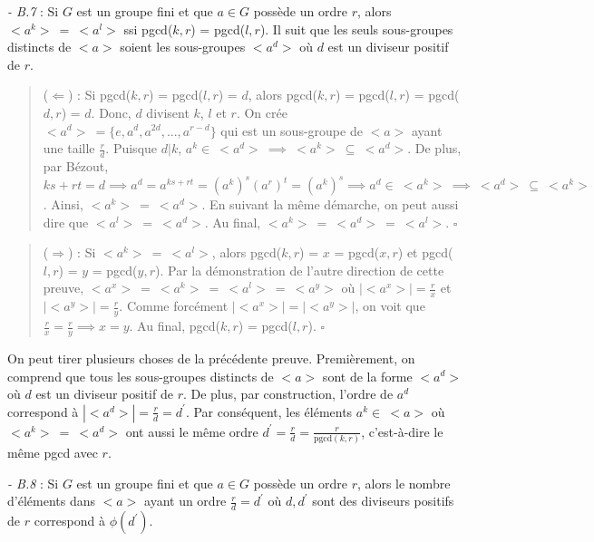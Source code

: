 \textit{- B.7} : Si $G$ est un groupe fini et que $a \in G$ possède un ordre $r$, alors $<a^k> \ =  \ <a^l>$ ssi pgcd($k,r$) = pgcd($l,r$). Il suit que les seuls sous-groupes distincts de $<a>$ soient les sous-groupes $<a^d>$ où $d$ est un diviseur positif de $r$. 

\begin{quote}
    ($\Longleftarrow$) : Si pgcd($k,r$) = pgcd($l,r$) = $d$, alors pgcd($k,r$) = pgcd($l,r$) = pgcd($d,r$) = $d$. Donc, $d$ divisent $k$, $l$ et $r$. On crée $<a^d> \ = \{e, a^d, a^{2d}, ..., a^{r-d}\}$ qui est un sous-groupe de $<a>$ ayant une taille $\frac{r}{d}$. Puisque $d|k$,  $a^k \in \ <a^d> \ \implies \ <a^k> \ \subseteq \ <a^d>$. De plus, par Bézout, $ks + rt = d \implies a^d = a^{ks+rt} = (a^k)^s(a^r)^t = (a^k)^s \implies a^d \in \ <a^k> \ \implies \ <a^d> \ \subseteq \ <a^k>$. Ainsi, $<a^k> \ = \ <a^d>$. En suivant la même démarche, on peut aussi dire que $<a^l> \ = \ <a^d>$. Au final, $<a^k> \ = \ <a^d> \ = \ <a^l>$. $\square$
\end{quote}

\begin{quote}
    ($\Longrightarrow$) : Si $<a^k> \ = \ <a^l>$, alors pgcd($k,r$) = $x$ = pgcd($x,r$) et pgcd($l,r$) = $y$ = pgcd($y,r$). Par la démonstration de l'autre direction de cette preuve, $<a^x> \ = \ <a^k> \ = \ <a^l> \ = \ <a^y>$ où $|<a^x>| = \frac{r}{x}$ et $|<a^y>| = \frac{r}{y}$. Comme forcément $|<a^x>| = |<a^y>|$, on voit que $\frac{r}{x} = \frac{r}{y} \implies x = y$. Au final, pgcd($k,r$) = pgcd($l,r$). $\square$
\end{quote}

On peut tirer plusieurs choses de la précédente preuve. Premièrement, on comprend que tous les sous-groupes distincts de $<a>$ sont de la forme $<a^d>$ où $d$ est un diviseur positif de $r$. De plus, par construction, l'ordre de $a^d$ correspond à $|<a^d>| = \frac{r}{d} = d^{'}$. Par conséquent, les éléments $a^k \in \ <a>$ où $<a^k> \ = \ <a^d>$ ont aussi le même ordre $d^{'} = \frac{r}{d} = \frac{r}{\text{pgcd}(k,r)}$, c'est-à-dire le même pgcd avec $r$. 

\textit{- B.8} : Si $G$ est un groupe fini et que $a \in G$ possède un ordre $r$, alors le nombre d'éléments dans $<a>$ ayant un ordre $\frac{r}{d} = d^{'}$ où $d,d^{'}$ sont des diviseurs positifs de $r$ correspond à $\phi(d^{'})$.

